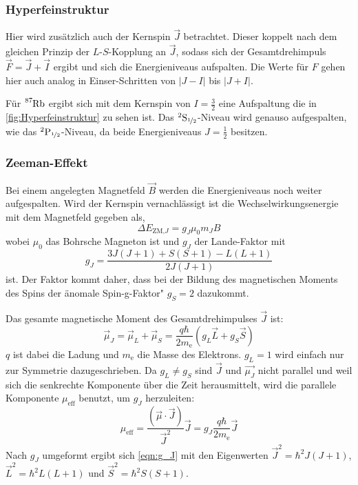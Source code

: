         \subsubsection*{Hyperfeinstruktur}
            Hier wird zusätzlich auch der Kernspin $\vec{J}$ betrachtet. Dieser koppelt nach dem gleichen Prinzip der $L$-$S$-Kopplung an $\vec{J}$, sodass sich der Gesamtdrehimpuls $\vec{F} = \vec{J} + \vec{I}$ ergibt und sich die Energieniveaus aufspalten.
            Die Werte für $F$ gehen hier auch analog in Einser-Schritten von $|J - I|$ bis $|J + I|$.

            Für $\ce{^{87}Rb}$ ergibt sich mit dem Kernspin von $I = \frac{3}{2}$ eine Aufspaltung die in \autoref{fig:Hyperfeinstruktur} zu sehen ist. Das $^2\text{S}_{\nicefrac{1}{2}}$-Niveau wird genauso aufgespalten, wie das $^2\text{P}_{\nicefrac{1}{2}}$-Niveau, da beide Energieniveaus $J = \frac{1}{2}$ besitzen.

        \subsubsection*{Zeeman-Effekt}
            Bei einem angelegten Magnetfeld $\vec{B}$ werden die Energieniveaus noch weiter aufgespalten.
            Wird der Kernspin vernachlässigt ist die Wechselwirkungsenergie mit dem Magnetfeld gegeben als,
            \begin{equation}
                \Delta E_{\text{ZM,}J} = g_J \mu_0 m_J B
                \label{eqn:zeeman_energy}
            \end{equation}
            wobei $\mu_0$ das Bohrsche Magneton ist und $g_J$ der Lande-Faktor mit
            \begin{equation}
                g_J = \frac{3J(J+1) + S(S+1) - L(L+1)}{2J(J+1)}
                \label{eqn:g_J}
            \end{equation}
            ist. Der Faktor kommt daher, dass bei der Bildung des magnetischen Moments des Spins der \"anomale Spin-g-Faktor" $g_S = 2$ dazukommt.

            Das gesamte magnetische Moment des Gesamtdrehimpulses $\vec{J}$ ist:
            \begin{equation*}
                \vec{\mu}_J = \vec{\mu}_L + \vec{\mu}_S = \frac{q \hbar}{2m_{\text{e}}} \left(g_L \vec{L} + g_S \vec{S}\right)
            \end{equation*}
            $q$ ist dabei die Ladung und $m_\text{e}$ die Masse des Elektrons. $g_L = 1$ wird einfach nur zur Symmetrie dazugeschrieben. Da $g_L \neq g_S$ sind $\vec{J}$ und $\vec{\mu_J}$ nicht parallel und weil sich die senkrechte Komponente über die Zeit herausmittelt, wird die parallele Komponente $\mu_{\text{eff}}$ benutzt, um $g_J$ herzuleiten:
            \begin{equation*}
                \mu_{\text{eff}} = \frac{(\vec{\mu} \cdot \vec{J})}{\vec{J}^2} \vec{J} = g_J \frac{q \hbar}{2m_{\text{e}}} \vec{J}
            \end{equation*}
            Nach $g_J$ umgeformt ergibt sich \eqref{eqn:g_J} mit den Eigenwerten $\vec{J}^2 = \hbar^2 J (J+1)$, $\vec{L}^2 = \hbar^2 L (L+1)$ und $\vec{S}^2 = \hbar^2 S (S+1)$.

